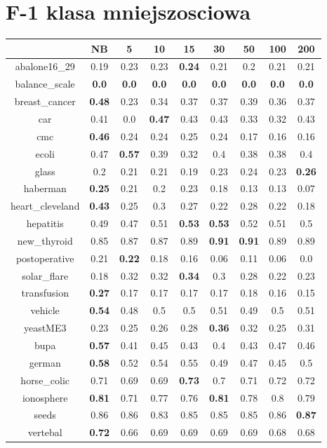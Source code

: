 \documentclass{article}%
\begin{document}
%
\section*{F{-}1 klasa mniejszosciowa}%
\begin{tabular}{c|cccccccc}%
\hline%
&NB&5&10&15&30&50&100&200\\%
\hline%
abalone16\_29&0.19&0.23&0.23&\textbf{0.24}&0.21&0.2&0.21&0.21\\%
\hline%
balance\_scale&\textbf{0.0}&\textbf{0.0}&\textbf{0.0}&\textbf{0.0}&\textbf{0.0}&\textbf{0.0}&\textbf{0.0}&\textbf{0.0}\\%
\hline%
breast\_cancer&\textbf{0.48}&0.23&0.34&0.37&0.37&0.39&0.36&0.37\\%
\hline%
car&0.41&0.0&\textbf{0.47}&0.43&0.43&0.33&0.32&0.43\\%
\hline%
cmc&\textbf{0.46}&0.24&0.24&0.25&0.24&0.17&0.16&0.16\\%
\hline%
ecoli&0.47&\textbf{0.57}&0.39&0.32&0.4&0.38&0.38&0.4\\%
\hline%
glass&0.2&0.21&0.21&0.19&0.23&0.24&0.23&\textbf{0.26}\\%
\hline%
haberman&\textbf{0.25}&0.21&0.2&0.23&0.18&0.13&0.13&0.07\\%
\hline%
heart\_cleveland&\textbf{0.43}&0.25&0.3&0.27&0.22&0.28&0.22&0.18\\%
\hline%
hepatitis&0.49&0.47&0.51&\textbf{0.53}&\textbf{0.53}&0.52&0.51&0.5\\%
\hline%
new\_thyroid&0.85&0.87&0.87&0.89&\textbf{0.91}&\textbf{0.91}&0.89&0.89\\%
\hline%
postoperative&0.21&\textbf{0.22}&0.18&0.16&0.06&0.11&0.06&0.0\\%
\hline%
solar\_flare&0.18&0.32&0.32&\textbf{0.34}&0.3&0.28&0.22&0.23\\%
\hline%
transfusion&\textbf{0.27}&0.17&0.17&0.17&0.17&0.18&0.16&0.15\\%
\hline%
vehicle&\textbf{0.54}&0.48&0.5&0.5&0.51&0.49&0.5&0.51\\%
\hline%
yeastME3&0.23&0.25&0.26&0.28&\textbf{0.36}&0.32&0.25&0.31\\%
\hline%
bupa&\textbf{0.57}&0.41&0.45&0.43&0.4&0.43&0.47&0.46\\%
\hline%
german&\textbf{0.58}&0.52&0.54&0.55&0.49&0.47&0.45&0.5\\%
\hline%
horse\_colic&0.71&0.69&0.69&\textbf{0.73}&0.7&0.71&0.72&0.72\\%
\hline%
ionosphere&\textbf{0.81}&0.71&0.77&0.76&\textbf{0.81}&0.78&0.8&0.79\\%
\hline%
seeds&0.86&0.86&0.83&0.85&0.85&0.85&0.86&\textbf{0.87}\\%
\hline%
vertebal&\textbf{0.72}&0.66&0.69&0.69&0.69&0.69&0.68&0.68\\%
\hline%
\end{tabular}
\end{document}
